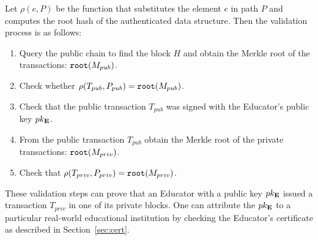 Let $\rho(e, P)$ be the function that substitutes the element $e$ in path $P$ and computes the root hash of the authenticated data structure. Then the validation process is as follows:
\begin{enumerate}
\item Query the public chain to find the block $H$ and obtain the Merkle root of the transactions: $\mathtt{root}(M_{pub})$.
\item Check whether $\rho(T_{pub}, P_{pub}) = \mathtt{root}(M_{pub})$.
\item Check that the public transaction $T_{pub}$ was signed with the Educator's public key $pk_{\mathbf{E}}$.
\item From the public transaction $T_{pub}$ obtain the Merkle root of the private transactions: $\mathtt{root}(M_{priv})$.
\item Check that $\rho(T_{priv}, P_{priv}) = \mathtt{root}(M_{priv})$.
\end{enumerate}

These validation steps can prove that an Educator with a public key $pk_{\mathbf{E}}$ issued a transaction $T_{priv}$ in one of its private blocks. One can attribute the $pk_{\mathbf{E}}$ to a particular real-world educational institution by checking the Educator's certificate as described in Section~\ref{sec:cert}.
